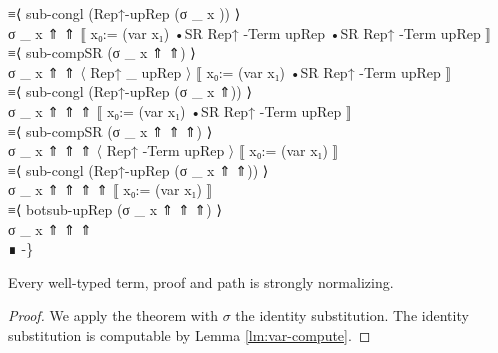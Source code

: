 {\begin{code}
{\>      ≡⟨ sub-congl (Rep↑-upRep (σ \_ x )) ⟩\<\\
\>        σ \_ x  ⇑ ⇑ ⟦ x₀:= (var x₁) •SR Rep↑ -Term upRep •SR Rep↑ -Term upRep ⟧\<\\
\>      ≡⟨ sub-compSR (σ \_ x  ⇑ ⇑) ⟩\<\\
\>        σ \_ x  ⇑ ⇑ 〈 Rep↑ \_ upRep 〉 ⟦ x₀:= (var x₁) •SR Rep↑ -Term upRep ⟧\<\\
\>      ≡⟨ sub-congl (Rep↑-upRep (σ \_ x  ⇑)) ⟩\<\\
\>        σ \_ x  ⇑ ⇑ ⇑ ⟦ x₀:= (var x₁) •SR Rep↑ -Term upRep ⟧\<\\
\>      ≡⟨ sub-compSR (σ \_ x  ⇑ ⇑ ⇑) ⟩\<\\
\>        σ \_ x  ⇑ ⇑ ⇑ 〈 Rep↑ -Term upRep 〉 ⟦ x₀:= (var x₁) ⟧\<\\
\>      ≡⟨ sub-congl (Rep↑-upRep (σ \_ x  ⇑ ⇑)) ⟩\<\\
\>        σ \_ x  ⇑ ⇑ ⇑ ⇑ ⟦ x₀:= (var x₁) ⟧\<\\
\>      ≡⟨ botsub-upRep (σ \_ x  ⇑ ⇑ ⇑) ⟩\<\\
\>        σ \_ x  ⇑ ⇑ ⇑\<\\
\>      ∎ -\}}\<%
\end{code}
}

\begin{corollary}
Every well-typed term, proof and path is strongly normalizing.
\end{corollary}

\begin{proof}
We apply the theorem with $\sigma$ the identity substitution.  The identity substitution is computable
by Lemma \ref{lm:var-compute}.
\end{proof}

\begin{code}%
\>  \AgdaSymbol{:}    \AgdaSymbol{(} \AgdaSymbol{:}  \AgdaSymbol{)} \<[55]%
\>[55]\<%
\\
\>[0]\<[31]%
\>[31]\AgdaSymbol{(} \AgdaSymbol{:}   \AgdaSymbol{(} \AgdaSymbol{))}          \<%
\end{code}


